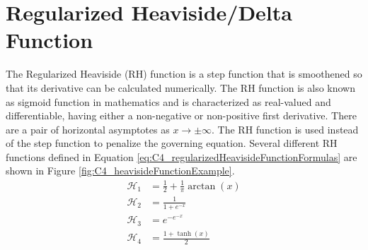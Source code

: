 \section{Regularized Heaviside/Delta Function}\label{sec:C4_RHandRDfunction}
The Regularized Heaviside (RH) function is a step function that is smoothened so that its derivative can be calculated numerically. The RH function is also known as sigmoid function in mathematics and is characterized as real-valued and differentiable, having either a non-negative or non-positive first derivative. There are a pair of horizontal asymptotes as $x \rightarrow \pm \infty$. The RH function is used instead of the step function to penalize the governing equation.  Several different RH functions defined in Equation \eqref{eq:C4_regularizedHeavisideFunctionFormulas} are shown in Figure \ref{fig:C4_heavisideFunctionExample}.
%
\begin{subequations}\label{eq:C4_regularizedHeavisideFunctionFormulas}
\begin{align}
    \mathcal{H}_1 &= \frac{1}{2} + \frac{1}{\pi} \arctan \left( x \right) \\
    \mathcal{H}_2 &= \frac{1}{1 + e^{-x}} \\
    \mathcal{H}_3 &= e^{-e^{-x}} \\
    \mathcal{H}_4 &= \frac{1 + \tanh(x)}{2}
\end{align}
\end{subequations}

